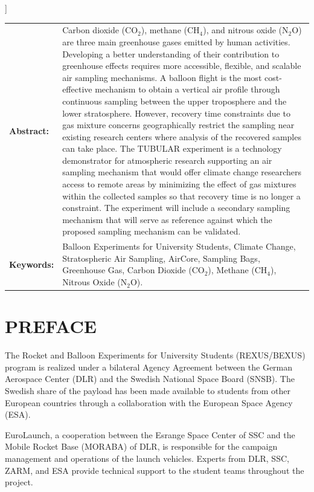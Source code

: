 ]\documentclass[a4paper,12pt,twoside]{article}
\begin{document}
\vspace{1cm}
\begin{tabular}{p{} p{}}
\textbf{Abstract:}     &  %
Carbon dioxide (CO$_{2}$), methane (CH$_{4}$), and nitrous oxide (N$_2$O) are three main greenhouse gases emitted by human activities. Developing a better understanding of their contribution to greenhouse effects requires more accessible, flexible, and scalable air sampling mechanisms. A balloon flight is the most cost-effective mechanism to obtain a vertical air profile through continuous sampling between the upper troposphere and the lower stratosphere. However, recovery time constraints due to gas mixture concerns geographically restrict the sampling near existing research centers where analysis of the recovered samples can take place. The TUBULAR experiment is a technology demonstrator for atmospheric research supporting an air sampling mechanism that would offer climate change researchers access to remote areas by minimizing the effect of gas mixtures within the collected samples so that recovery time is no longer a constraint. The experiment will include a secondary sampling mechanism that will serve as reference against which the proposed sampling mechanism can be validated.
  &  \\
\textbf{Keywords:}     & %
Balloon Experiments for University Students, Climate Change, Stratospheric Air Sampling, AirCore, Sampling Bags, Greenhouse Gas, Carbon Dioxide (CO$_{2}$), Methane (CH$_{4}$), Nitrous Oxide (N$_{2}$O).
\end{tabular}

\vfill

\newpage
\tableofcontents

\newpage
\section*{PREFACE} \markboth{}{}

The Rocket and Balloon Experiments for University Students (REXUS/BEXUS) program is realized under a bilateral Agency Agreement between the German Aerospace Center (DLR) and the Swedish National Space Board (SNSB). The Swedish share of the
payload has been made available to students from other European countries through a collaboration with the European Space Agency (ESA).

EuroLaunch, a cooperation between the Esrange Space Center of SSC and the Mobile Rocket Base (MORABA) of DLR, is responsible for the campaign management and operations of the launch vehicles. Experts from DLR, SSC, ZARM, and ESA provide
technical support to the student teams throughout the project.
\end{document}
